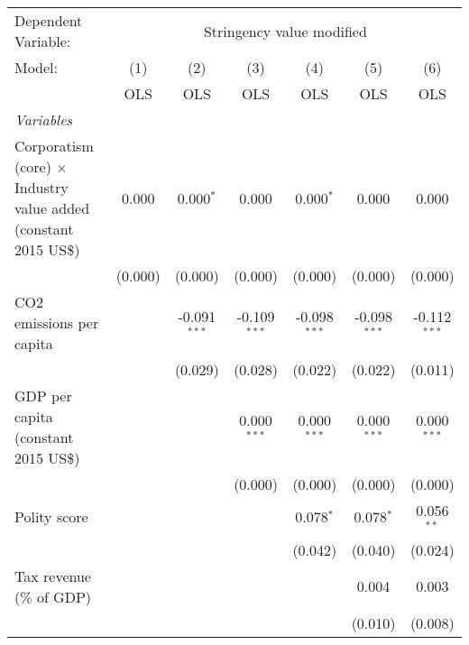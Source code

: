
\begingroup
\centering
\begin{tabular}{lcccccc}
   \toprule
   Dependent Variable: & \multicolumn{6}{c}{Stringency value modified}\\
   Model:                                                                  & (1)     & (2)            & (3)            & (4)            & (5)            & (6)\\  
                                                                           &  OLS    & OLS            & OLS            & OLS            & OLS            & OLS\\  
   \midrule
   \emph{Variables}\\
   Corporatism (core) $\times$ Industry value added (constant 2015 US\$)   & 0.000   & 0.000$^{*}$    & 0.000          & 0.000$^{*}$    & 0.000          & 0.000\\   
                                                                           & (0.000) & (0.000)        & (0.000)        & (0.000)        & (0.000)        & (0.000)\\   
   CO2 emissions per capita                                                &         & -0.091$^{***}$ & -0.109$^{***}$ & -0.098$^{***}$ & -0.098$^{***}$ & -0.112$^{***}$\\   
                                                                           &         & (0.029)        & (0.028)        & (0.022)        & (0.022)        & (0.011)\\   
   GDP per capita (constant 2015 US\$)                                     &         &                & 0.000$^{***}$  & 0.000$^{***}$  & 0.000$^{***}$  & 0.000$^{***}$\\   
                                                                           &         &                & (0.000)        & (0.000)        & (0.000)        & (0.000)\\   
   Polity score                                                            &         &                &                & 0.078$^{*}$    & 0.078$^{*}$    & 0.056$^{**}$\\   
                                                                           &         &                &                & (0.042)        & (0.040)        & (0.024)\\   
   Tax revenue (\% of GDP)                                                 &         &                &                &                & 0.004          & 0.003\\   
                                                                           &         &                &                &                & (0.010)        & (0.008)\\   

\end{tabular}
